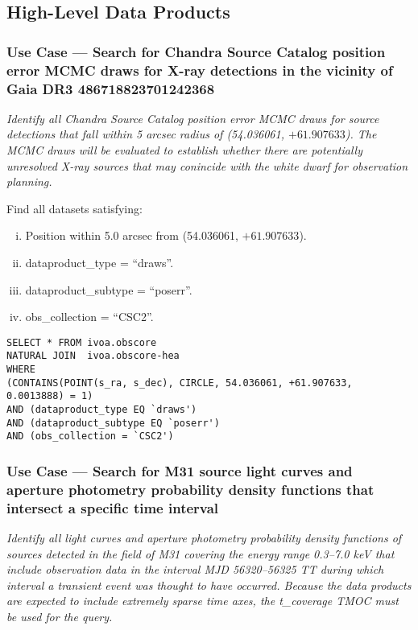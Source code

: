 \subsection{High-Level Data Products}

\subsubsection{Use Case --- Search for Chandra Source Catalog position error MCMC draws for X-ray detections in the vicinity of Gaia DR3 486718823701242368}

{\em Identify all Chandra Source Catalog position error MCMC draws for source detections that fall within 5 arcsec radius of  (54.036061, $+61.907633$).  The MCMC draws will be evaluated to establish whether there are potentially unresolved X-ray sources that may conincide with the white dwarf for observation planning.\/}

\medskip
\noindent Find all datasets satisfying:
\begin{enumerate}[(i)]
  \item Position within 5.0 arcsec from (54.036061, $+61.907633$).
  \item dataproduct\_type = ``draws''.
  \item dataproduct\_subtype = ``poserr''.
  \item obs\_collection = ``CSC2''.
\end{enumerate}

\begin{verbatim}
SELECT * FROM ivoa.obscore
NATURAL JOIN  ivoa.obscore-hea 
WHERE
(CONTAINS(POINT(s_ra, s_dec), CIRCLE, 54.036061, +61.907633, 0.0013888) = 1) 
AND (dataproduct_type EQ `draws')
AND (dataproduct_subtype EQ `poserr')
AND (obs_collection = `CSC2')
\end{verbatim}


\subsubsection{Use Case --- Search for M31 source light curves and aperture photometry probability density functions that intersect a specific time interval}

{\em Identify all light curves and aperture photometry probability density functions of sources detected in the field of M31 covering the energy range 0.3--7.0 keV that include observation data in the interval MJD 56320--56325 TT during which interval a transient event was thought to have occurred.  Because the data products are expected to include extremely sparse time axes, the t\_coverage TMOC must be used for the query.\/}

